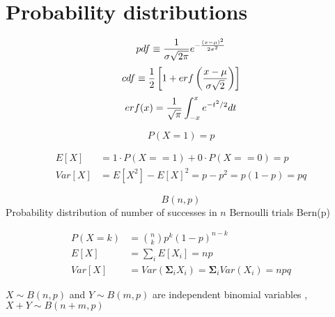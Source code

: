 \section{Probability distributions}

\begin{slide} 
{\huge
$$pdf\equiv {1\over \sigma \sqrt{2\pi}} e^{-{(x-\mu)^2 \over 2\sigma^2}}$$
$$cdf\equiv {1\over 2}\left[1+erf\left({x-\mu \over \sigma\sqrt{2}}\right)\right]$$
}
$$erf(x) = {1 \over \sqrt{\pi}}\int_{-x}^{x}e^{-t^2/2}dt$$
\end{slide}
\begin{slide} 
    $$P(X=1) = p$$
    
    \begin{align*}
        E[X] &= 1\cdot P(X==1) + 0\cdot P(X==0) =p \\
        Var[X] &= E[X^2]-E[X]^2 = p-p^2 =p(1-p) = pq
    \end{align*}
\end{slide}

\begin{slide} 
\begin{shaded}
    $$B(n,p)$$
    Probability distribution of number of successes in $n$ Bernoulli trials Bern(p)
\end{shaded}
\begin{align*}
    P(X=k)  &= {n \choose k} p^k(1-p)^{n-k}\\
    E[X] &= \sum_iE[X_i] = np\\
    Var[X] &= Var\left(\mathbf{\Sigma}_i X_i\right) = \mathbf{\Sigma}_i Var(X_i) = npq
\end{align*}

\noindent{}
$X \sim B(n, p)$ and $Y \sim B(m, p)$ are independent binomial variables , $X+Y \sim B(n+m, p)$
\end{slide}

\begin{slide} [Poisson]
\end{slide}
\begin{slide} [Dirichlet]
\end{slide}
\begin{slide} [Beta]
\end{slide}


